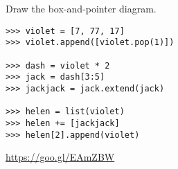 \begin{blocksection}
\question Draw the box-and-pointer diagram. \\

\begin{lstlisting}
>>> violet = [7, 77, 17]
>>> violet.append([violet.pop(1)])

>>> dash = violet * 2
>>> jack = dash[3:5]
>>> jackjack = jack.extend(jack)

>>> helen = list(violet)
>>> helen += [jackjack]
>>> helen[2].append(violet)
\end{lstlisting}

\begin{solution}[1in]
\url{https://goo.gl/EAmZBW}
\end{solution}
\end{blocksection}
